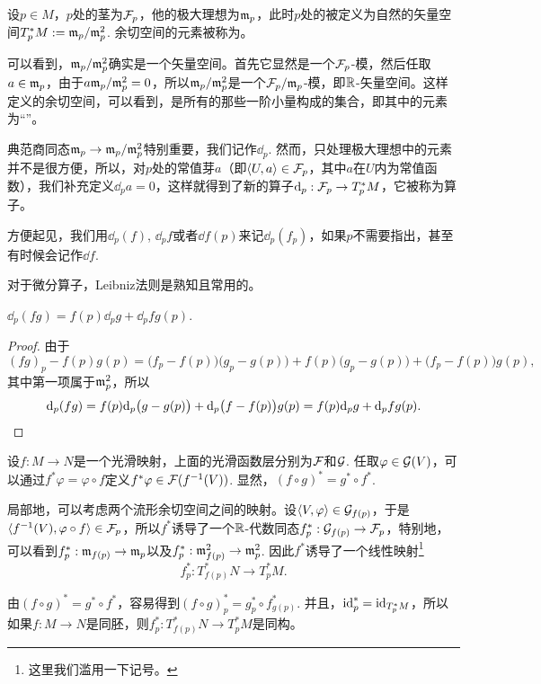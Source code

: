 \begin{para}
设$p\in M$，$p$处的茎为$\mathcal{F}_p$，他的极大理想为$\mathfrak{m}_p$，此时$p$处的被定义为自然的矢量空间$T_p^*M:=\mathfrak{m}_p/\mathfrak{m}_p^2$. 余切空间的元素被称为。
\end{para}

可以看到，$\mathfrak{m}_p/\mathfrak{m}_p^2$确实是一个矢量空间。首先它显然是一个$\mathcal{F}_p$-模，然后任取$a\in \mathfrak{m}_p$，由于$a\mathfrak{m}_p/\mathfrak{m}_p^2=0$，所以$\mathfrak{m}_p/\mathfrak{m}_p^2$是一个$\mathcal{F}_p/\mathfrak{m}_p$-模，即$\mathbb{R}$-矢量空间。这样定义的余切空间，可以看到，是所有的那些一阶小量构成的集合，即其中的元素为“”。

\begin{para}[微分算子]
典范商同态$\mathfrak{m}_p\to \mathfrak{m}_p/\mathfrak{m}_p^2$特别重要，我们记作$\dd_p$. 然而，只处理极大理想中的元素并不是很方便，所以，对$p$处的常值芽$a$（即$\langle U,a\rangle\in\mathcal{F}_p$，其中$a$在$U$内为常值函数），我们补充定义$\dd_pa=0$，这样就得到了新的算子$\mathrm{d}_p:\mathcal{F}_p\to T_p^*M$，它被称为算子。

方便起见，我们用$\dd_p(f)$, $\dd_pf$或者$\dd f(p)$来记$\dd_p(f_p)$，如果$p$不需要指出，甚至有时候会记作$\dd f$. 
\end{para}

对于微分算子，Leibniz法则是熟知且常用的。

\begin{pro}[Leibniz法则]
$\dd_p (fg)=f(p)\dd_pg+\dd_pf g(p)$.
\end{pro}

\begin{proof}
由于
\[
	(fg)_p-f(p)g(p)=\bigl(f_p-f(p)\bigr)\bigl(g_p-g(p)\bigr)+f(p)\bigl(g_p-g(p)\bigr)+\bigl(f_p-f(p)\bigr)g(p),
\]
其中第一项属于$\mathfrak{m}_p^2$，所以
\[
\mathrm{d}_p (fg)=f(p)\mathrm{d}_p\bigl(g-g(p)\bigr)+\mathrm{d}_p\bigl(f-f(p)\bigr)g(p)=f(p)\mathrm{d}_pg+\mathrm{d}_pf g(p).\qedhere
\]
\end{proof}

\begin{para}[拉回映射]
设$f:M\to N$是一个光滑映射，上面的光滑函数层分别为$\mathcal{F}$和$\mathcal{G}$. 任取$\varphi\in \mathcal{G}(V)$，可以通过$f^*\varphi=\varphi\circ f$定义$f^*\varphi\in \mathcal{F}(f^{-1}(V))$. 显然，$(f\circ g)^*=g^*\circ f^*$.

局部地，可以考虑两个流形余切空间之间的映射。设$\langle V,\varphi\rangle\in \mathcal{G}_{f(p)}$，于是$\langle f^{-1}(V),\varphi\circ f\rangle\in \mathcal{F}_p$，所以$f^*$诱导了一个$\mathbb{R}$-代数同态$f^*_p:\mathcal{G}_{f(p)}\to \mathcal{F}_p$，特别地，可以看到$f^*_p:\mathfrak{m}_{f(p)}\to \mathfrak{m}_{p}$以及$f^*_p:\mathfrak{m}^2_{f(p)}\to \mathfrak{m}^2_{p}$. 因此$f^*$诱导了一个线性映射\footnote{这里我们滥用一下记号。}
\[
	f^*_p:T_{f(p)}^*N\to T_p^*M.
\]

由$(f\circ g)^*=g^*\circ f^*$，容易得到$(f\circ g)^*_p=g^*_p\circ f^*_{g(p)}$. 并且，$\operatorname{id}^*_p=\operatorname{id}_{T_p^*M}$，所以如果$f:M\to N$是同胚，则$f_p^*:T_{f(p)}^*N\to T_p^*M$是同构。
\end{para}

